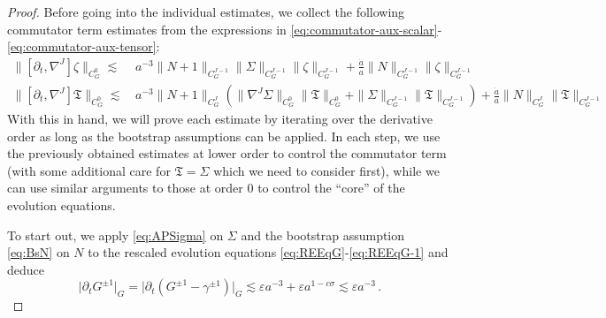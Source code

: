 \documentclass[11pt,leqno,textwidth=10cm]{amsart}
\numberwithin{equation}{section}
\theoremstyle{definition}
\theoremstyle{plain}
\newcommand{\1}{\mathbbm{1}}
\renewcommand{\epsilon}{\varepsilon}
\newcommand{\del}{\partial}
\begin{document}
\begin{proof}
Before going into the individual estimates, we collect the following commutator term estimates from the expressions in \eqref{eq:commutator-aux-scalar}-\eqref{eq:commutator-aux-tensor}:
\begin{align}
\|[\del_t,\nabla^J]\zeta\|_{C^0_G}\lesssim&\,a^{-3}\|N+1\|_{C^{J-1}_G}\|\Sigma\|_{C^{J-1}_G}\|\zeta\|_{C^{J-1}_G}+\frac{\dot{a}}a\|N\|_{C^{J-1}_G}\|\zeta\|_{C^{J-1}_G} \label{eq:aux-comm-est-zeta}\\
\|[\del_t,\nabla^J]\mathfrak{T}\|_{C^0_G}\lesssim&\,a^{-3}\|N+1\|_{C^{J}_G}\left(\|\nabla^J\Sigma\|_{C^0_G}\|\mathfrak{T}\|_{C^0_G}+\|\Sigma\|_{C^{J-1}_G}\|\mathfrak{T}\|_{C^{J-1}_G}\right)+\frac{\dot{a}}a\|N\|_{C^J_G}\|\mathfrak{T}\|_{C^{J-1}_G} \label{eq:aux-comm-est-T}
\end{align}
With this in hand, we will prove each estimate by iterating over the derivative order as long as the bootstrap assumptions can be applied. In each step, we use the previously obtained estimates at lower order to control the commutator term (with some additional care for $\mathfrak{T}=\Sigma$ which we need to consider first), while we can use similar arguments to those at order $0$ to control the \enquote{core} of the evolution equations. 

To start out, we apply \eqref{eq:APSigma} on $\Sigma$ and the bootstrap assumption \eqref{eq:BsN} on $N$ to the rescaled evolution equations \eqref{eq:REEqG}-\eqref{eq:REEqG-1} and deduce
\begin{equation}\label{eq:AP-deltG}
\lvert \del_tG^{\pm1}\rvert_G=\lvert \del_t(G^{\pm 1}-\gamma^{\pm1})\rvert_G\lesssim \epsilon a^{-3}+\epsilon a^{1-c\sigma}\lesssim \epsilon a^{-3}\,.
\end{equation}


\end{proof}
\end{document}
